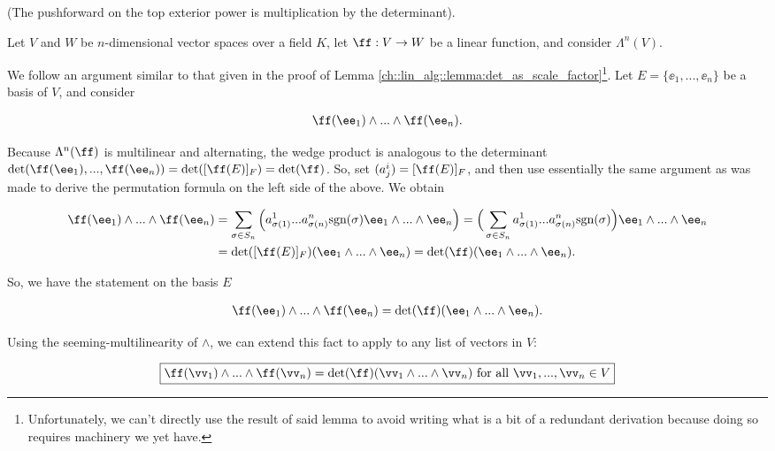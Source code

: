 \begin{deriv}
\label{ch::exterior_powers::rmk::top_pushforward_det}
    (The pushforward on the top exterior power is multiplication by the determinant).
    
    Let $V$ and $W$ be $n$-dimensional vector spaces over a field $K$, let $\ff:V \rightarrow W$ be a linear function, and consider $\Lambda^n(V)$.
    
    We follow an argument similar to that given in the proof of Lemma \ref{ch::lin_alg::lemma:det_as_scale_factor}\footnote{Unfortunately, we can't directly use the result of said lemma to avoid writing what is a bit of a redundant derivation because doing so requires machinery we yet have.}. Let $E = \{\ee_1, ..., \ee_n\}$ be a basis of $V$, and consider
    
    \begin{align*}
        \ff(\ee_1) \wedge ... \wedge \ff(\ee_n).
    \end{align*}
    
    Because $\Lambda^n(\ff)$ is multilinear and alternating, the wedge product is analogous to the determinant $\det(\ff(\ee_1), ..., \ff(\ee_n)) = \det([\ff(E)]_F) = \det(\ff)$. So, set $(a^i_j) = [\ff(E)]_F$, and then use essentially the same argument as was made to derive the permutation formula on the left side of the above. We obtain
    
    \begin{align*}
        \ff(\ee_1) \wedge ... \wedge 
        \ff(\ee_n) 
        &= \sum_{\sigma \in S_n} \Big( a^1_{\sigma(1)} ... a^n_{\sigma(n)} \sgn(\sigma) \ee_1 \wedge ... \wedge \ee_n \Big)
        = \Big( \sum_{\sigma \in S_n} a^1_{\sigma(1)} ... a^n_{\sigma(n)} \sgn(\sigma) \Big) \ee_1 \wedge ... \wedge \ee_n \\
        &= \det([\ff(E)]_F) (\ee_1 \wedge ... \wedge \ee_n)
        = \det(\ff) (\ee_1 \wedge ... \wedge \ee_n).
    \end{align*}
    
   So, we have the statement on the basis $E$
   
   \begin{align*}
        \ff(\ee_1) \wedge ... \wedge 
        \ff(\ee_n) = \det(\ff) (\ee_1 \wedge ... \wedge \ee_n).
   \end{align*}
   
   Using the seeming-multilinearity of $\wedge$, we can extend this fact to apply to any list of vectors in $V$:
   
   \begin{align*}
       \boxed
       {
        \ff(\vv_1) \wedge ... \wedge \ff(\vv_n) = \det(\ff) ( \vv_1 \wedge ... \wedge \vv_n ) \text{ for all $\vv_1, ..., \vv_n \in V$}
       }
   \end{align*}
   

\end{deriv}
